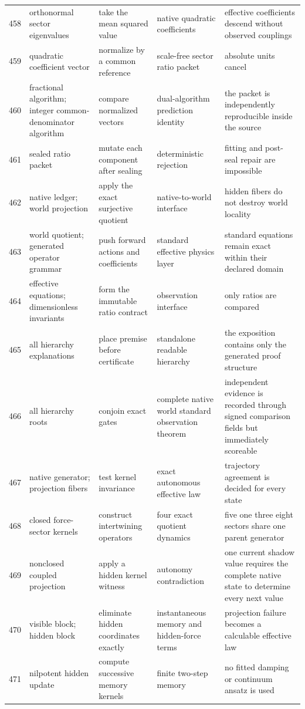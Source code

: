 \documentclass[11pt]{article}
\numberwithin{equation}{section}
\theoremstyle{remark}
\begin{document}
\begin{landscape}
\begin{longtable}{p{0.65cm}p{3.5cm}p{4.0cm}p{4.0cm}p{4.6cm}}
458&orthonormal sector eigenvalues&take the mean squared value&native quadratic coefficients&effective coefficients descend without observed couplings\\
459&quadratic coefficient vector&normalize by a common reference&scale-free sector ratio packet&absolute units cancel\\
460&fractional algorithm; integer common-denominator algorithm&compare normalized vectors&dual-algorithm prediction identity&the packet is independently reproducible inside the source\\
461&sealed ratio packet&mutate each component after sealing&deterministic rejection&fitting and post-seal repair are impossible\\
462&native ledger; world projection&apply the exact surjective quotient&native-to-world interface&hidden fibers do not destroy world locality\\
463&world quotient; generated operator grammar&push forward actions and coefficients&standard effective physics layer&standard equations remain exact within their declared domain\\
464&effective equations; dimensionless invariants&form the immutable ratio contract&observation interface&only ratios are compared\\
465&all hierarchy explanations&place premise before certificate&standalone readable hierarchy&the exposition contains only the generated proof structure\\
466&all hierarchy roots&conjoin exact gates&complete native world standard observation theorem&independent evidence is recorded through signed comparison fields but immediately scoreable\\
467&native generator; projection fibers&test kernel invariance&exact autonomous effective law&trajectory agreement is decided for every state\\
468&closed force-sector kernels&construct intertwining operators&four exact quotient dynamics&five one three eight sectors share one parent generator\\
469&nonclosed coupled projection&apply a hidden kernel witness&autonomy contradiction&one current shadow value requires the complete native state to determine every next value\\
470&visible block; hidden block&eliminate hidden coordinates exactly&instantaneous memory and hidden-force terms&projection failure becomes a calculable effective law\\
471&nilpotent hidden update&compute successive memory kernels&finite two-step memory&no fitted damping or continuum ansatz is used\\

\end{longtable}
\end{landscape}
\end{document}
